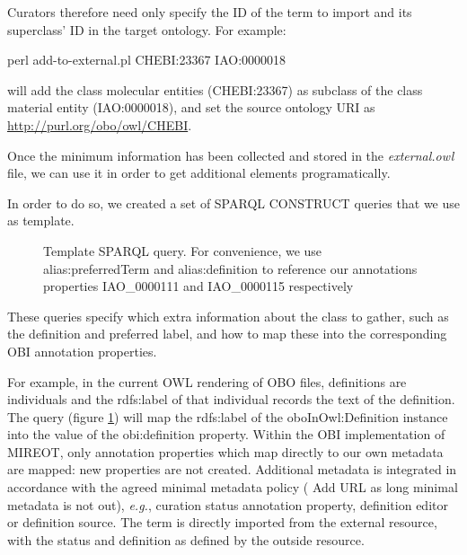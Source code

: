 \documentclass{elsart3p}    %
\def\sourcetabsize{4}
\newenvironment{sourcestyle}{\begin{scriptsize}}{\end{scriptsize}}
\begin{document}

Curators therefore need only specify the ID of the term to import and its superclass' ID in the target ontology.
For example:


\begin{sourcestyle}%
\begin{verbatimtab}[\sourcetabsize]
    perl add-to-external.pl CHEBI:23367 IAO:0000018
\end{verbatimtab}%
\end{sourcestyle}
will add the class molecular entities (CHEBI:23367) as subclass of the class material entity (IAO:0000018), and set the source ontology URI as \url{http://purl.org/obo/owl/CHEBI}.

Once the minimum information has been collected  and stored in the \emph{external.owl} file, we can use it in order to get additional elements programatically.


In order to do so, we created a set of SPARQL \cite{RefWorks:1531} CONSTRUCT queries that we use as template. 
\begin{figure}[t]
\begin{sourcestyle}%
 
\end{sourcestyle}
\caption{Template SPARQL query. For convenience, we use alias:preferredTerm and
alias:definition to reference our annotations properties IAO\_0000111 and IAO\_0000115 respectively}
\label{fig:sparql}
\end{figure}
These queries specify which extra information about the class to gather, such as the definition and preferred label, and how to map these into the corresponding OBI annotation properties. 

For example, in the current OWL rendering of OBO files, definitions are individuals and the rdfs:label of that individual records the text of the definition.
The query (figure \ref{fig:sparql}) will map the rdfs:label of the oboInOwl:Definition instance into the value of the obi:definition property.
Within the OBI implementation of MIREOT, only annotation properties which map directly to our own metadata are mapped: new properties are not created.
Additional metadata is integrated in accordance with the agreed minimal metadata policy ( Add URL as long minimal metadata is not out), \emph{e.g.}, curation status annotation property, definition editor or definition source.
The term is directly imported from the external resource, with the status and definition as defined by the outside resource. %
\end{document}
